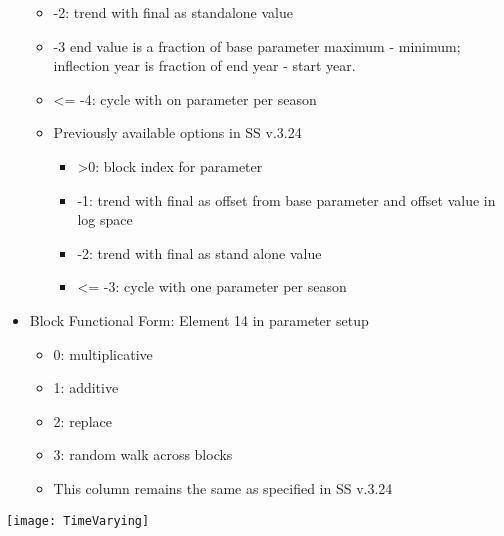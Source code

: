 \begin{itemize}
\begin{itemize}
\begin{itemize}
			\end{itemize}
			\item -2: trend with final as standalone value
			\item -3 end value is a fraction of base parameter maximum - minimum; inflection year is fraction of end year - start year.
			\item <= -4: cycle with on parameter per season
			\item Previously available options in SS v.3.24
			\begin{itemize}
				\item >0: block index for parameter
				\item -1: trend with final as offset from base parameter and offset value in log space
				\item -2: trend with final as stand alone value
				\item <= -3: cycle with one parameter per season
			\end{itemize}
		\end{itemize}
	\item Block Functional Form: Element 14 in parameter setup
		\begin{itemize}
			\item 0: multiplicative 
			\item 1: additive
			\item 2: replace
			\item 3: random walk across blocks
			\item This column remains the same as specified in SS v.3.24
		\end{itemize}
\end{itemize}

\begin{center}
	\texttt{[image: TimeVarying]}
\end{center}

